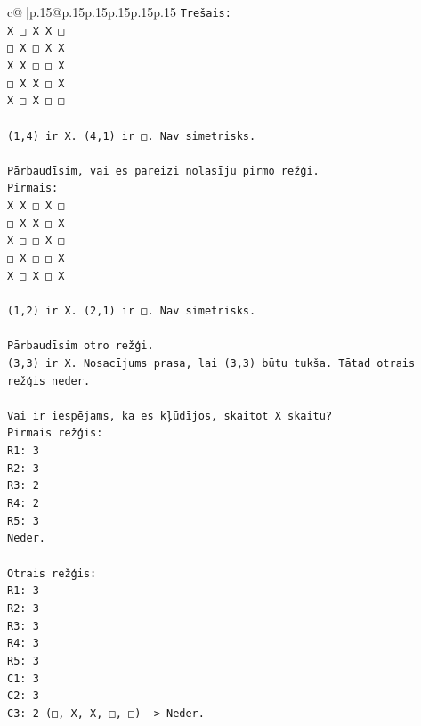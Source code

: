 \documentclass{article}
\begin{document}
{\begin{supertabular}{c@{$\;$}|p{.15\linewidth}@{}p{.15\linewidth}p{.15\linewidth}p{.15\linewidth}p{.15\linewidth}p{.15\linewidth}}
{{{\texttt{Trešais:} \\
\texttt{X □ X X □} \\
\texttt{□ X □ X X} \\
\texttt{X X □ □ X} \\
\texttt{□ X X □ X} \\
\texttt{X □ X □ □} \\
\\ 
\texttt{(1,4) ir X. (4,1) ir □. Nav simetrisks.} \\
\\ 
\texttt{Pārbaudīsim, vai es pareizi nolasīju pirmo režģi.} \\
\texttt{Pirmais:} \\
\texttt{X X □ X □} \\
\texttt{□ X X □ X} \\
\texttt{X □ □ X □} \\
\texttt{□ X □ □ X} \\
\texttt{X □ X □ X} \\
\\ 
\texttt{(1,2) ir X. (2,1) ir □. Nav simetrisks.} \\
\\ 
\texttt{Pārbaudīsim otro režģi.} \\
\texttt{(3,3) ir X. Nosacījums prasa, lai (3,3) būtu tukša. Tātad otrais režģis neder.} \\
\\ 
\texttt{Vai ir iespējams, ka es kļūdījos, skaitot X skaitu?} \\
\texttt{Pirmais režģis:} \\
\texttt{R1: 3} \\
\texttt{R2: 3} \\
\texttt{R3: 2} \\
\texttt{R4: 2} \\
\texttt{R5: 3} \\
\texttt{Neder.} \\
\\ 
\texttt{Otrais režģis:} \\
\texttt{R1: 3} \\
\texttt{R2: 3} \\
\texttt{R3: 3} \\
\texttt{R4: 3} \\
\texttt{R5: 3} \\
\texttt{C1: 3} \\
\texttt{C2: 3} \\
\texttt{C3: 2 (□, X, X, □, □) {-}> Neder.} \\
\\ 
}}}
\end{supertabular}}
\end{document}

